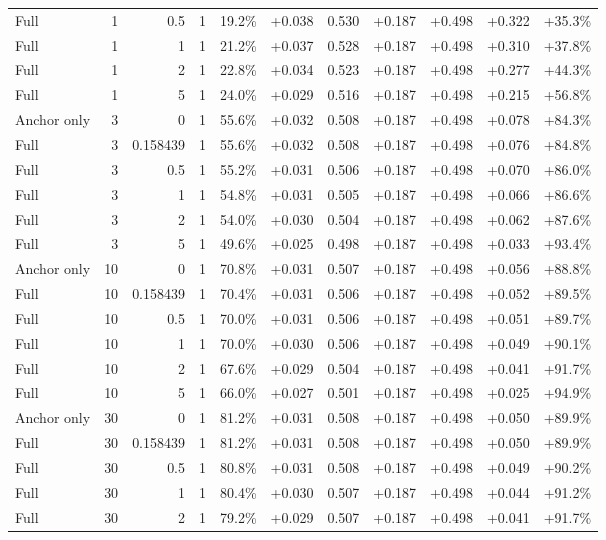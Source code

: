 \begin{table}[htbp]
\begin{tabular}{lrrrccccccc}
Full & 1 & 0.5 & 1 & 19.2\% & +0.038 & 0.530 & +0.187 & +0.498 & +0.322 & +35.3\% \\
Full & 1 & 1 & 1 & 21.2\% & +0.037 & 0.528 & +0.187 & +0.498 & +0.310 & +37.8\% \\
Full & 1 & 2 & 1 & 22.8\% & +0.034 & 0.523 & +0.187 & +0.498 & +0.277 & +44.3\% \\
Full & 1 & 5 & 1 & 24.0\% & +0.029 & 0.516 & +0.187 & +0.498 & +0.215 & +56.8\% \\
Anchor only & 3 & 0 & 1 & 55.6\% & +0.032 & 0.508 & +0.187 & +0.498 & +0.078 & +84.3\% \\
Full & 3 & 0.158439 & 1 & 55.6\% & +0.032 & 0.508 & +0.187 & +0.498 & +0.076 & +84.8\% \\
Full & 3 & 0.5 & 1 & 55.2\% & +0.031 & 0.506 & +0.187 & +0.498 & +0.070 & +86.0\% \\
Full & 3 & 1 & 1 & 54.8\% & +0.031 & 0.505 & +0.187 & +0.498 & +0.066 & +86.6\% \\
Full & 3 & 2 & 1 & 54.0\% & +0.030 & 0.504 & +0.187 & +0.498 & +0.062 & +87.6\% \\
Full & 3 & 5 & 1 & 49.6\% & +0.025 & 0.498 & +0.187 & +0.498 & +0.033 & +93.4\% \\
Anchor only & 10 & 0 & 1 & 70.8\% & +0.031 & 0.507 & +0.187 & +0.498 & +0.056 & +88.8\% \\
Full & 10 & 0.158439 & 1 & 70.4\% & +0.031 & 0.506 & +0.187 & +0.498 & +0.052 & +89.5\% \\
Full & 10 & 0.5 & 1 & 70.0\% & +0.031 & 0.506 & +0.187 & +0.498 & +0.051 & +89.7\% \\
Full & 10 & 1 & 1 & 70.0\% & +0.030 & 0.506 & +0.187 & +0.498 & +0.049 & +90.1\% \\
Full & 10 & 2 & 1 & 67.6\% & +0.029 & 0.504 & +0.187 & +0.498 & +0.041 & +91.7\% \\
Full & 10 & 5 & 1 & 66.0\% & +0.027 & 0.501 & +0.187 & +0.498 & +0.025 & +94.9\% \\
Anchor only & 30 & 0 & 1 & 81.2\% & +0.031 & 0.508 & +0.187 & +0.498 & +0.050 & +89.9\% \\
Full & 30 & 0.158439 & 1 & 81.2\% & +0.031 & 0.508 & +0.187 & +0.498 & +0.050 & +89.9\% \\
Full & 30 & 0.5 & 1 & 80.8\% & +0.031 & 0.508 & +0.187 & +0.498 & +0.049 & +90.2\% \\
Full & 30 & 1 & 1 & 80.4\% & +0.030 & 0.507 & +0.187 & +0.498 & +0.044 & +91.2\% \\
Full & 30 & 2 & 1 & 79.2\% & +0.029 & 0.507 & +0.187 & +0.498 & +0.041 & +91.7\% \\

\end{tabular}
\end{table}
